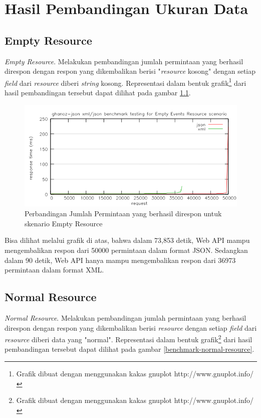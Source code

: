 \documentclass[a4paper, 12pt, oneside]{report}
\begin{document}
\chapter{Hasil Pembandingan Ukuran Data} \label{lampiran:hasil-pembandingan-ukuran-data}

\section{Empty Resource}

\onehalfspacing \textit{Empty Resource}. Melakukan pembandingan jumlah permintaan yang berhasil direspon dengan respon yang dikembalikan berisi "\textit{resource} kosong" dengan setiap \textit{field} dari \textit{resource} diberi \textit{string} kosong. Representasi dalam bentuk grafik\footnote{Grafik dibuat dengan menggunakan kakas gnuplot http://www.gnuplot.info/} dari hasil pembandingan tersebut dapat dilihat pada gambar \ref{benchmark-empty-resource}.

\begin{figure}[htp]
\centering
\includegraphics[scale=0.65]{images/benchmark-empty-resource.png}
\caption{Perbandingan Jumlah Permintaan yang berhasil direspon untuk skenario Empty Resource}
\label{benchmark-empty-resource}
\end{figure}

Bisa dilihat melalui grafik di atas, bahwa dalam 73,853 detik, Web API mampu mengembalikan respon dari 50000 permintaan dalam format JSON. Sedangkan dalam 90 detik, Web API hanya mampu mengembalikan respon dari 36973 permintaan dalam format XML.

\section{Normal Resource}

\onehalfspacing \textit{Normal Resource}. Melakukan pembandingan jumlah permintaan yang berhasil direspon dengan respon yang dikembalikan berisi \textit{resource} dengan setiap \textit{field} dari \textit{resource} diberi data yang "normal". Representasi dalam bentuk grafik\footnote{Grafik dibuat dengan menggunakan kakas gnuplot http://www.gnuplot.info/} dari hasil pembandingan tersebut dapat dilihat pada gambar \ref{benchmark-normal-resource}.
\end{document}
